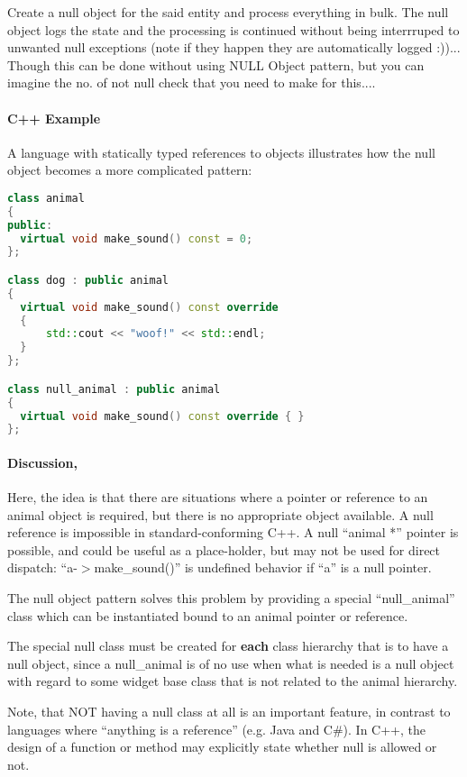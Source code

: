 \documentclass{book}
\begin{document}
Create a null object for the said entity and process everything in bulk.
The null object logs the state and the processing is continued without being interrruped to unwanted null exceptions (note if they happen they are automatically logged :))... 
Though this can be done without using NULL Object pattern, but you can imagine the no. of not null check that you need to make for this....
\paragraph{C++ Example} A language with statically typed references to objects illustrates how the null object becomes a more complicated pattern:
\begin{lstlisting}[caption={Null Object Pattern sample code}, language=C++]
class animal 
{
public:
  virtual void make_sound() const = 0;
};

class dog : public animal 
{
  virtual void make_sound() const override 
  { 
      std::cout << "woof!" << std::endl; 
  }
};

class null_animal : public animal 
{
  virtual void make_sound() const override { }
};
\end{lstlisting}

\paragraph{Discussion,} Here, the idea is that there are situations where a pointer or reference to an animal object is required, but there is no appropriate object available.
A null reference is impossible in standard-conforming C++.
A null ``animal *'' pointer is possible, and could be useful as a place-holder, but may not be used for direct dispatch: ``a-$>$make\_sound()'' is undefined behavior if ``a'' is a null pointer.

The null object pattern solves this problem by providing a special ``null\_animal'' class which can be instantiated bound to an animal pointer or reference.

The special null class must be created for \textbf{each} class hierarchy that is to have a null object,
since a null\_animal is of no use when what is needed is a null object with regard to some widget base class that is not related to the animal hierarchy.

Note, that NOT having a null class at all is an important feature,
in contrast to languages where ``anything is a reference'' (e.g. Java and C\#). In C++, the design of a function or method may explicitly state whether null is allowed or not.
\end{document}
